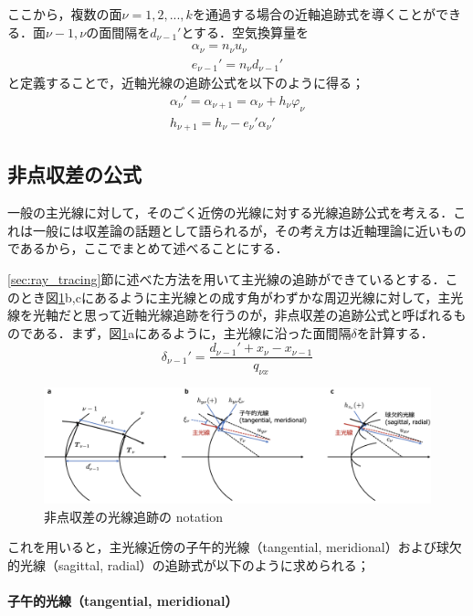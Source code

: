 \documentclass{jsarticle}
\begin{document}
ここから，複数の面$\nu=1,2,...,k$を通過する場合の近軸追跡式を導くことができる．面$\nu-1,\nu$の面間隔を$d_{\nu-1}'$とする．空気換算量を
\begin{gather}
    \alpha_\nu=n_\nu u_\nu\\
    e_{\nu-1}'=n_\nu d_{\nu-1}'
\end{gather}
と定義することで，近軸光線の追跡公式を以下のように得る；
\begin{gather}
    \alpha_\nu'=\alpha_{\nu+1}=\alpha_\nu +h_\nu\varphi_\nu\\
    h_{\nu+1}=h_\nu-e_\nu'\alpha_\nu'
\end{gather}

\subsection{非点収差の公式}
\label{subsec:astigmatic_paraxial_tracing}
一般の主光線に対して，そのごく近傍の光線に対する光線追跡公式を考える．これは一般には収差論の話題として語られるが，その考え方は近軸理論に近いものであるから，ここでまとめて述べることにする．

\ref{sec:ray_tracing}節に述べた方法を用いて主光線の追跡ができているとする．このとき図\ref{fig:astigmatic_tracing}b,cにあるように主光線との成す角がわずかな周辺光線に対して，主光線を光軸だと思って近軸光線追跡を行うのが，非点収差の追跡公式と呼ばれるものである．まず，図\ref{fig:astigmatic_tracing}aにあるように，主光線に沿った面間隔$\delta$を計算する．
%
\begin{equation}
    \delta_{\nu-1}'=\frac{d_{\nu-1}'+x_\nu-x_{\nu-1}}{q_{\nu x}}
\end{equation}
%
\begin{figure}[b]
    \centering
    \includegraphics[width=15cm]{astigmatic_tracing.png}
    \caption{非点収差の光線追跡の notation}
    \label{fig:astigmatic_tracing}
\end{figure}
%
これを用いると，主光線近傍の子午的光線（tangential, meridional）および球欠的光線（sagittal, radial）の追跡式が以下のように求められる；

\paragraph{子午的光線（tangential, meridional）}
\end{document}
